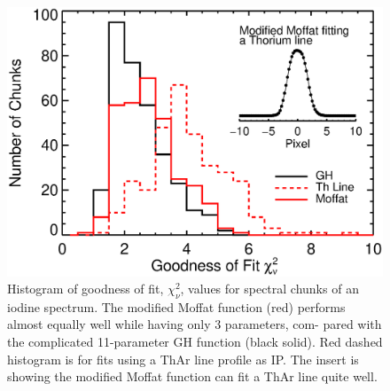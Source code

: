 \begin{figure}
\centering
\includegraphics[scale=0.45]{het/thar_vs_moffat.eps}
\caption{Histogram of goodness of fit, $\chi^2_\nu$, values for
  spectral chunks of an iodine spectrum. The modified Moffat function
  (red) performs almost equally well while having only 3 parameters,
  com- pared with the complicated 11-parameter GH function (black
  solid). Red dashed histogram is for fits using a ThAr line profile
  as IP. The insert is showing the modified Moffat function can fit a
  ThAr line quite well.
\label{het:fig:moffat}}
\end{figure}


